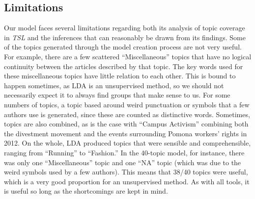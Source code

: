 \documentclass[a4paper]{article}
\begin{document}
\subsection{Limitations}
Our model faces several limitations regarding both its analysis of topic coverage in \textit{TSL} and the inferences that can reasonably be drawn from its findings. Some of the topics generated through the model creation process are not very useful. For example, there are a few scattered ``Miscellaneous''  topics that have no logical continuity between the articles described by that topic. The key words used for these miscellaneous topics have little relation to each other. This is bound to happen sometimes, as LDA is an unsupervised method, so we should not necessarily expect it to always find groups that make sense to us. For some numbers of topics, a topic based around weird punctuation or symbols that a few authors use is generated, since these are counted as distinctive words. Sometimes, topics are also combined, as is the case with ``Campus Activism'' combining both the divestment movement and the events surrounding Pomona workers' rights in 2012. On the whole, LDA produced topics that were sensible and comprehensible, ranging from ``Running'' to ``Fashion.'' In the 40-topic model, for instance, there was only one ``Miscellaneous'' topic and one ``NA'' topic (which was due to the weird symbols used by a few authors). This means that 38/40 topics were useful, which is a very good proportion for an unsupervised method. As with all tools, it is useful so long as the shortcomings are kept in mind.
\end{document}
